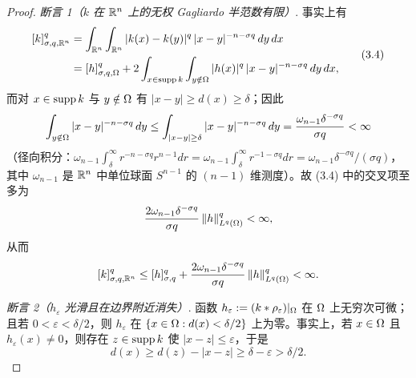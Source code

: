 \begin{proof}
\emph{断言 1（$k$ 在 $\mathbb{R}^n$ 上的无权 Gagliardo 半范数有限）}. 事实上有
\begin{equation}
\begin{split}
  [k]^q_{\sigma,q,\mathbb{R}^n}
  &=\int_{\mathbb{R}^n}\int_{\mathbb{R}^n}|k(x)-k(y)|^q\,|x-y|^{-n-\sigma q}\,dy\,dx \\
  &=[h]^q_{\sigma,q,\Omega}
  +2\int_{x\in\operatorname{supp} k}\int_{y\notin\Omega}|h(x)|^q\,|x-y|^{-n-\sigma q}\,dy\,dx ,
\end{split}
  \tag{3.4}
\end{equation}
而对 $x\in\operatorname{supp} k$ 与 $y\notin\Omega$ 有 $|x-y|\ge d(x)\ge\delta$；因此
\[
  \int_{y\notin\Omega}|x-y|^{-n-\sigma q}\,dy
  \le\int_{|x-y|\ge\delta}|x-y|^{-n-\sigma q}\,dy
  =\frac{\omega_{n-1}\delta^{-\sigma q}}{\sigma q}<\infty
\]
（径向积分：$\omega_{n-1}\int_\delta^\infty r^{-n-\sigma q}r^{n-1}dr=\omega_{n-1}\int_\delta^\infty r^{-1-\sigma q}dr=\omega_{n-1}\delta^{-\sigma q}/(\sigma q)$，其中 $\omega_{n-1}$ 是 $\mathbb{R}^n$ 中单位球面 $S^{n-1}$ 的 $(n-1)$ 维测度）。故 (3.4) 中的交叉项至多为
\[
  \frac{2\omega_{n-1}\delta^{-\sigma q}}{\sigma q}\,\|h\|^q_{L^q(\Omega)}<\infty ,
\]
从而
\[
  [k]^q_{\sigma,q,\mathbb{R}^n}\le[h]^q_{\sigma,q}
  +\frac{2\omega_{n-1}\delta^{-\sigma q}}{\sigma q}\,\|h\|^q_{L^q(\Omega)}<\infty .
\]

\emph{断言 2（$h_\varepsilon$ 光滑且在边界附近消失）}. 函数 $h_\varepsilon:=(k*\rho_\varepsilon)|_\Omega$ 在 $\Omega$ 上无穷次可微；且若 $0<\varepsilon<\delta/2$，则 $h_\varepsilon$ 在 $\{x\in\Omega : d(x)<\delta/2\}$ 上为零。事实上，若 $x\in\Omega$ 且 $h_\varepsilon(x)\neq0$，则存在 $z\in\operatorname{supp} k$ 使 $|x-z|\le\varepsilon$，于是
\[
  d(x)\ge d(z)-|x-z|\ge\delta-\varepsilon>\delta/2 .
\]


\end{proof}
